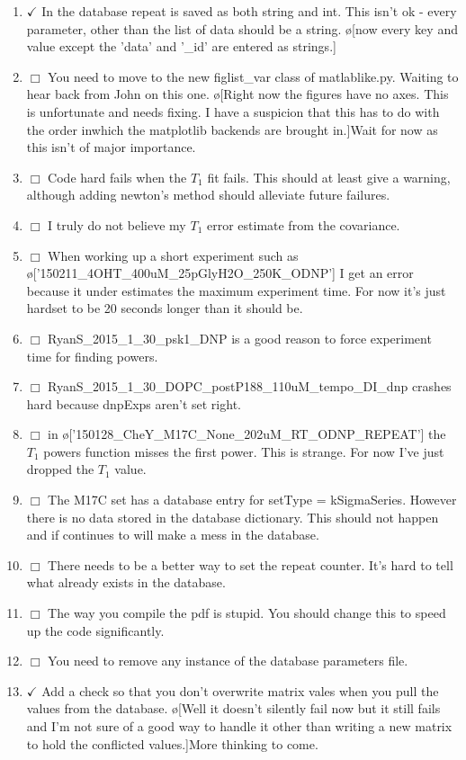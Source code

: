 \documentclass[10pt]{book}
\begin{document}
\begin{enumerate}
    \item $\checkmark$ In the database repeat is saved as both string and int. This isn't ok - every parameter, other than the list of data should be a string. \o[now every key and value except the 'data' and '\_id' are entered as strings.]{}
    \item $\Box$ You need to move to the new figlist\_var class of matlablike.py. Waiting to hear back from John on this one. \o[Right now the figures have no axes. This is unfortunate and needs fixing. I have a suspicion that this has to do with the order inwhich the matplotlib backends are brought in.]{Wait for now as this isn't of major importance.}
    \item $\Box$ Code hard fails when the $T_1$ fit fails. This should at least give a warning, although adding newton's method should alleviate future failures.
    \item $\Box$ I truly do not believe my $T_1$ error estimate from the covariance.
    \item $\Box$ When working up a short experiment such as \o['150211_4OHT_400uM_25pGlyH2O_250K_ODNP']{} I get an error because it under estimates the maximum experiment time. For now it's just hardset to be 20 seconds longer than it should be.
    \item $\Box$ RyanS_2015_1_30_psk1_DNP is a good reason to force experiment time for finding powers.
    \item $\Box$ RyanS_2015_1_30_DOPC_postP188_110uM_tempo_DI_dnp crashes hard because dnpExps aren't set right. 
    \item $\Box$ in \o['150128_CheY_M17C_None_202uM_RT_ODNP_REPEAT']{} the $T_1$ powers function misses the first power. This is strange. For now I've just dropped the $T_1$ value.
    \item $\Box$ The M17C set has a database entry for setType = kSigmaSeries. However there is no data stored in the database dictionary. This should not happen and if continues to will make a mess in the database.
    \item $\Box$ There needs to be a better way to set the repeat counter. It's hard to tell what already exists in the database.
    \item $\Box$ The way you compile the pdf is stupid. You should change this to speed up the code significantly.
    \item $\Box$ You need to remove any instance of the database parameters file.
    \item $\checkmark$ Add a check so that you don't overwrite matrix vales when you pull the values from the database. \o[Well it doesn't silently fail now but it still fails and I'm not sure of a good way to handle it other than writing a new matrix to hold the conflicted values.]{More thinking to come.}

\end{enumerate}
\end{document}
